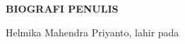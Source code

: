 \begin{center}
  \Large
  \textbf{BIOGRAFI PENULIS}
\end{center}


\vspace{2ex}


Helmika Mahendra Priyanto, lahir pada \lipsum[1]

\lipsum[2]
